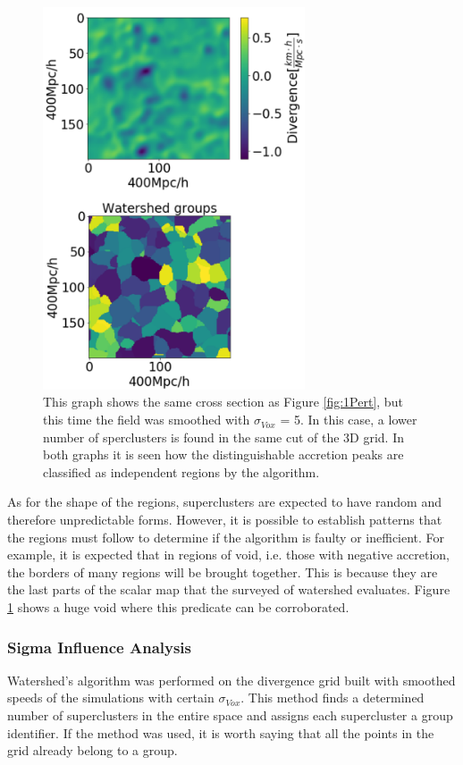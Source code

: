 \documentclass[usenatbib]{mnras}
\begin{document}
\begin{figure}
    \centering
    \includegraphics[width=220pt]{smooth_watershed_05.pdf}
    \caption{This graph shows the same cross section as Figure \ref{fig:1Pert}, but this time the field was smoothed with $\sigma_{Vox}$ = 5. In this case, a lower number of sperclusters is found in the same cut of the 3D grid. In both graphs it is seen how the distinguishable accretion peaks are classified as independent regions by the algorithm.}
    \label{fig:3Pert}
\end{figure}
As for the shape of the regions, superclusters are expected to have random and therefore unpredictable forms. However, it is possible to establish patterns that the regions must follow to determine if the algorithm is faulty or inefficient. For example, it is expected that in regions of void, i.e. those with negative accretion, the borders of many regions will be brought together. This is because they are the last parts of the scalar map that the surveyed of watershed evaluates. Figure \ref{fig:3Pert} shows a huge void where this predicate can be corroborated.


\subsubsection{Sigma Influence Analysis}
\label{sec:Sigmainfluence}
Watershed's algorithm was performed on the divergence grid built with smoothed speeds of the simulations with certain  $\sigma_{Vox}$. This method finds a determined number of superclusters in the entire space and assigns each supercluster a group identifier. If the method was used, it is worth saying that all the points in the grid already belong to a group.
\end{document}
